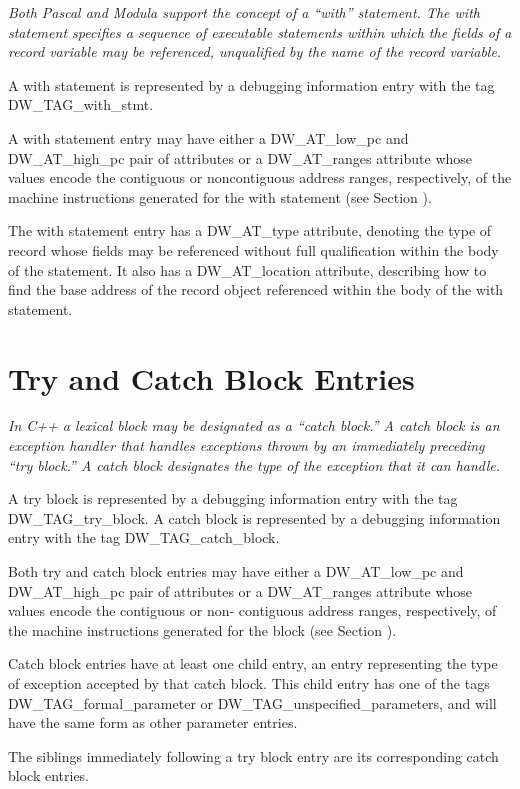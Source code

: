 \textit{Both Pascal and Modula support the concept of a ``with''
statement. The with statement specifies a sequence of
executable statements within which the fields of a record
variable may be referenced, unqualified by the name of the
record variable.}

A with statement is represented by a debugging information
entry with the tag DW\-\_TAG\-\_with\-\_stmt.

A with statement entry may have either a DW\_AT\_low\_pc and
DW\_AT\_high\_pc pair of attributes or a DW\_AT\_ranges attribute
whose values encode the contiguous or non\dash contiguous address
ranges, respectively, of the machine instructions generated
for the with statement 
(see Section ).

The with statement entry has a DW\_AT\_type attribute, denoting
the type of record whose fields may be referenced without full
qualification within the body of the statement. It also has
a DW\_AT\_location attribute, describing how to find the base
address of the record object referenced within the body of
the with statement.

\section{Try and Catch Block Entries}
\label{chap:tryandcatchblockentries}

\textit{In C++ a lexical block may be designated as a ``catch
block.'' A catch block is an exception handler that handles
exceptions thrown by an immediately preceding ``try block.''
A catch block designates the type of the exception that it
can handle.}

A try block is represented by a debugging information entry
with the tag DW\_TAG\_try\_block.  A catch block is represented by
a debugging information entry with the tag DW\_TAG\_catch\_block.

Both try and catch block entries may have either a
DW\_AT\_low\_pc and DW\_AT\_high\_pc pair of attributes or a
DW\_AT\_ranges attribute whose values encode the contiguous
or non- contiguous address ranges, respectively, of the
machine instructions generated for the block (see Section
).

Catch block entries have at least one child entry, an
entry representing the type of exception accepted by
that catch block. This child entry has one of the tags
DW\_TAG\_formal\_parameter or DW\_TAG\_unspecified\_parameters,
and will have the same form as other parameter entries.

The siblings immediately following a try block entry are its
corresponding catch block entries.







